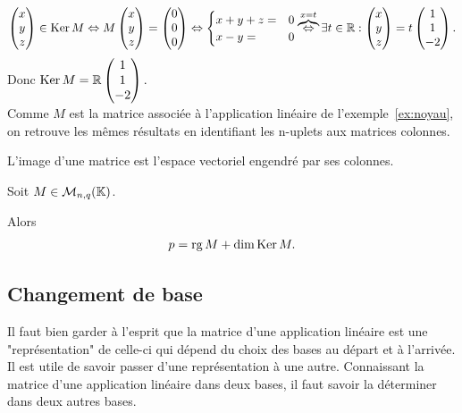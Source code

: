 \documentclass{book}
\begin{document}
\begin{Exemple}
$$\begin{pmatrix}x \\y \\z\\\end{pmatrix} \in \operatorname{Ker} M \Leftrightarrow M\begin{pmatrix}x \\y \\z\\\end{pmatrix}=\begin{pmatrix}0 \\0 \\0\\\end{pmatrix} \Leftrightarrow \begin{cases}x+y+z=&0\\x-y=&0\end{cases}\overbrace{\Leftrightarrow}^{x=t} \exists t \in \mathbb{R}: \begin{pmatrix}x \\y \\z\\\end{pmatrix}=t\begin{pmatrix}1 \\1 \\-2\\\end{pmatrix} .$$
Donc $\operatorname{Ker} M =\mathbb{R} \begin{pmatrix}1 \\1 \\-2\\\end{pmatrix}.$\\
Comme $M$ est la matrice associée à l'application linéaire de l'exemple~\ref{ex:noyau}, on retrouve les mêmes résultats en identifiant les n-uplets aux matrices colonnes. 
\end{Exemple}
\begin{Proposition}
L'image d'une matrice est l'espace vectoriel engendré par ses colonnes.
\end{Proposition}
\begin{Theoreme}

Soit $M \in   \mathcal{M}_{n,q}(\mathbb{K}) $.

Alors 
\[ p = \operatorname{rg} M + \dim \operatorname{Ker} M. \]
\end{Theoreme}
\subsection{Changement de base}
Il faut bien garder à l'esprit que la matrice d'une application linéaire est une "représentation"
de celle-ci qui dépend du choix des bases au départ et à l'arrivée. Il est utile de savoir passer
d'une représentation à une autre. Connaissant la matrice d'une application linéaire dans deux
bases, il faut savoir la déterminer dans deux autres bases.
\end{document}
